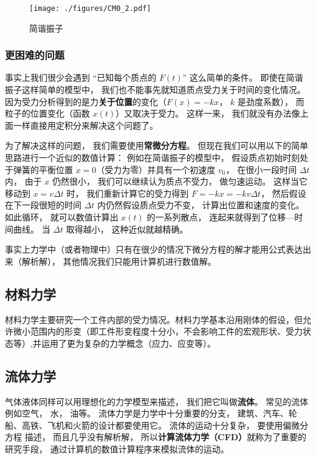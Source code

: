 \begin{figure}[ht]
\centering
\texttt{[image: ./figures/CM0\_2.pdf]}
\caption{简谐振子} \label{CM0_fig2}
\end{figure}

\subsubsection{更困难的问题}
事实上我们很少会遇到 “已知每个质点的 $F(t)$” 这么简单的条件。 即使在简谐振子这样简单的模型中， 我们也不能事先就知道质点受力关于时间的变化情况。 因为受力分析得到的是力\textbf{关于位置}的变化（$F(x) = -k x$， $k$ 是劲度系数）， 而粒子的位置变化（函数 $x(t)$）又取决于受力。 这样一来， 我们就没有办法像上面一样直接用定积分来解决这个问题了。

为了解决这样的问题， 我们需要使用\textbf{常微分方程}。 但现在我们可以用以下的简单思路进行一个近似的数值计算： 例如在简谐振子的模型中， 假设质点初始时刻处于弹簧的平衡位置 $x = 0$（受力为零）并具有一个初速度 $v_0$， 在很小一段时间 $\Delta t$ 内， 由于 $x$ 仍然很小， 我们可以继续认为质点不受力， 做匀速运动。 这样当它移动到 $x = v\Delta t$ 时， 我们重新计算它的受力得到 $F = -kx = -k v \Delta t$， 然后假设在下一段很短的时间 $\Delta t$ 内仍然假设质点受力不变， 计算出位置和速度的变化。 如此循环， 就可以数值计算出 $x(t)$ 的一系列散点， 连起来就得到了位移—时间曲线。 当 $\Delta t$ 取得越小， 这种近似就越精确。

事实上力学中（或者物理中）只有在很少的情况下微分方程的解才能用公式表达出来（解析解）， 其他情况我们只能用计算机进行数值解。

\subsection{材料力学}
材料力学主要研究一个工件内部的受力情况。材料力学基本沿用刚体的假设，但允许微小范围内的形变（即工件形变程度十分小，不会影响工件的宏观形状、受力状态等）,并运用了更为复杂的力学概念（应力、应变等）。


\subsection{流体力学}
气体液体同样可以用理想化的力学模型来描述， 我们把它叫做\textbf{流体}。 常见的流体例如空气， 水， 油等。 流体力学是力学中十分重要的分支， 建筑、汽车、轮船、高铁、飞机和火箭的设计都要使用它。 流体的运动十分复杂， 要使用偏微分方程%
描述， 而且几乎没有解析解， 所以\textbf{计算流体力学（CFD）}就称为了重要的研究手段， 通过计算机的数值计算程序来模拟流体的运动。

